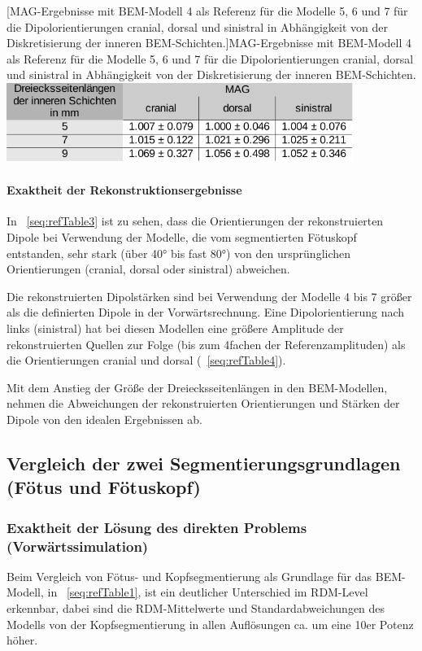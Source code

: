 \begin{center}
\begin{minipage}{17cm}
[MAG{}-Ergebnisse mit BEM{}-Modell 4 als Referenz für
die Modelle 5, 6 und 7 für die Dipolorientierungen cranial, dorsal und
sinistral in Abhängigkeit von der Diskretisierung der inneren
BEM{}-Schichten.]{MAG-Ergebnisse mit BEM-Modell 4 als Referenz für die
Modelle 5, 6 und 7 für die Dipolorientierungen cranial, dorsal und
sinistral in Abhängigkeit von der Diskretisierung der inneren
BEM-Schichten. }
\label{seq:refTable6}\includegraphics[width=11.269cm,height=2.593cm]{BA-img/BA-img19.pdf}\end{minipage}
\end{center}
\paragraph{Exaktheit der Rekonstruktionsergebnisse}
In \tablename~\ref{seq:refTable3} ist zu sehen, dass die Orientierungen
der rekonstruierten Dipole bei Verwendung der Modelle, die vom
segmentierten Fötuskopf entstanden, sehr stark (über 40° bis fast 80°)
von den ursprünglichen Orientierungen (cranial, dorsal oder sinistral)
abweichen.

Die rekonstruierten Dipolstärken sind bei Verwendung der Modelle 4 bis 7
größer als die definierten Dipole in der Vorwärtsrechnung. Eine
Dipolorientierung nach links (sinistral) hat bei diesen Modellen eine
größere Amplitude der rekonstruierten Quellen zur Folge (bis zum
4fachen der Referenzamplituden) als die Orientierungen cranial und
dorsal (\tablename~\ref{seq:refTable4}).

Mit dem Anstieg der Größe der Dreiecksseitenlängen in den BEM-Modellen,
nehmen die Abweichungen der rekonstruierten Orientierungen und Stärken
der Dipole von den idealen Ergebnissen ab.

\subsection{Vergleich der zwei Segmentierungsgrundlagen (Fötus und
Fötuskopf)}
\subsubsection{Exaktheit der Lösung des direkten Problems
(Vorwärtssimulation)}
Beim Vergleich von Fötus- und Kopfsegmentierung als Grundlage für das
BEM-Modell, in \tablename~\ref{seq:refTable1}, ist ein deutlicher
Unterschied im RDM-Level erkennbar, dabei sind die RDM-Mittelwerte und
Standardabweichungen des Modells von der Kopfsegmentierung in allen
Auflösungen ca. um eine 10er Potenz höher.


